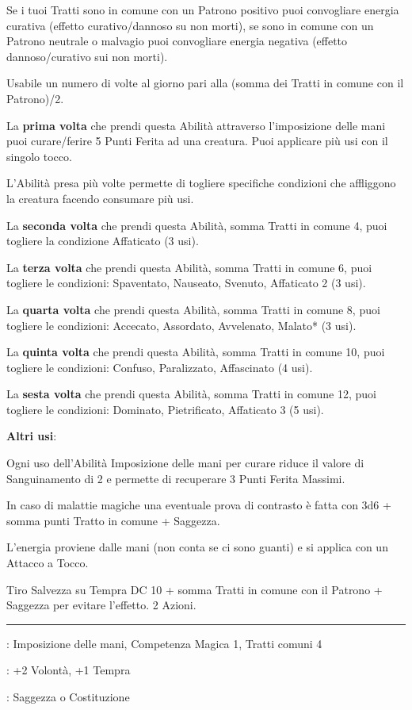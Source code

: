 \begin{multicols}{2}
Se i tuoi Tratti sono in comune con un Patrono positivo puoi convogliare energia curativa (effetto curativo/dannoso su non morti), se sono in comune con un Patrono neutrale o malvagio puoi convogliare energia negativa (effetto dannoso/curativo sui non morti).

Usabile un numero di volte al giorno pari alla (somma dei Tratti in comune con il Patrono)/2.

La \textbf{prima volta} che prendi questa Abilità attraverso l'imposizione delle mani puoi curare/ferire 5 Punti Ferita ad una creatura. Puoi applicare più usi con il singolo tocco.

L'Abilità presa più volte permette di togliere specifiche condizioni che affliggono la creatura facendo consumare più usi.

La \textbf{seconda volta} che prendi questa Abilità, somma Tratti in comune 4, puoi togliere la condizione Affaticato (3 usi).

La \textbf{terza volta} che prendi questa Abilità, somma Tratti in comune 6, puoi togliere le condizioni: Spaventato, Nauseato, Svenuto, Affaticato 2 (3 usi).

La \textbf{quarta volta} che prendi questa Abilità, somma Tratti in comune 8, puoi togliere le condizioni: Accecato, Assordato, Avvelenato, Malato* (3 usi).

La \textbf{quinta volta} che prendi questa Abilità, somma Tratti in comune 10, puoi togliere le condizioni: Confuso, Paralizzato, Affascinato (4 usi).

La \textbf{sesta volta} che prendi questa Abilità, somma Tratti in comune 12, puoi togliere le condizioni: Dominato, Pietrificato, Affaticato 3 (5 usi).

\textbf{Altri usi}:

\smallskip

Ogni uso dell'Abilità Imposizione delle mani per curare riduce il valore di Sanguinamento di 2 e permette di recuperare 3 Punti Ferita Massimi.

In caso di malattie magiche una eventuale prova di contrasto è fatta con 3d6 + somma punti Tratto in comune + Saggezza.

L'energia proviene dalle mani (non conta se ci sono guanti) e si applica con un Attacco a Tocco.

Tiro Salvezza su Tempra DC 10 + somma Tratti in comune con il Patrono + Saggezza per evitare l'effetto. 2 Azioni.

\smallskip\noindent\rule{\linewidth}{2pt} \hypertarget{Incanalare Energia}{}\medskip{}
\noindent
\begin{description}[noitemsep, topsep=0pt, parsep=0pt, partopsep=0pt, leftmargin=0cm, labelwidth=2.5cm]
    \item[\textbf{Requisito}]: Imposizione delle mani, Competenza Magica 1, Tratti comuni 4
    \item[\textbf{Tiri Salvezza}]: +2 Volontà, +1 Tempra
    \item[\textbf{Caratteristica}]: Saggezza o Costituzione
\end{description}


\end{multicols}
